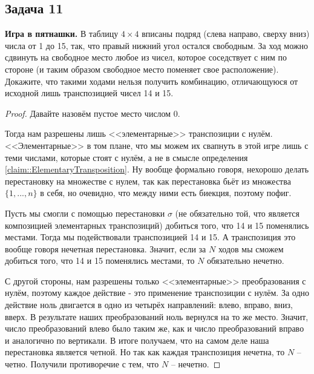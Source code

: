 \subsection{Задача 11}

\textbf{Игра в пятнашки.} В таблицу $4 \times 4$ вписаны подряд (слева направо, сверху вниз) числа от 1 до 15, так, что правый нижний угол остался свободным. За ход можно сдвинуть
на свободное место любое из чисел, которое соседствует с ним по стороне (и таким
образом свободное место поменяет свое расположение). Докажите, что такими ходами нельзя получить комбинацию, отличающуюся от исходной лишь транспозицией
чисел 14 и 15.

\begin{proof}
Давайте назовём пустое место числом 0.

Тогда нам разрешены лишь <<элементарные>> транспозиции с нулём. <<Элементарные>> в том плане, что мы можем их свапнуть в этой игре лишь с теми числами, которые стоят с нулём, а не в смысле определения \ref{claim::ElementaryTransposition}. Ну вообще формально говоря, нехорошо делать перестановку на множестве с нулем, так как перестановка бьёт из множества $\{1, ..., n\}$ в себя, но очевидно, что между ними есть биекция, поэтому пофиг.

Пусть мы смогли с помощью перестановки $\sigma$ (не обязательно той, что является композицией элементарных транспозиций) добиться того, что 14 и 15 поменялись местами. Тогда мы подействовали транспозицией 14 и 15. А транспозиция это вообще говоря нечетная перестановка. Значит, если за $N$ ходов мы сможем добиться того, что 14 и 15 поменялись местами, то $N$ обязательно нечетно. 

С другой стороны, нам разрешены только <<элементарные>> преобразования с нулём, поэтому каждое действие - это применение транспозиции с нулём. За одно действие ноль двигается в одно из четырёх направлений: влево, вправо, вниз, вверх. В результате наших преобразований ноль вернулся на то же место. Значит, число преобразований влево было таким же, как и число преобразований вправо и аналогично по вертикали. В итоге получаем, что на самом деле наша перестановка является четной. Но так как каждая транспозиция нечетна, то $N$ -- четно. Получили противоречие с тем, что $N$ -- нечетно.
\end{proof}